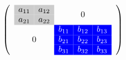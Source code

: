 \documentclass{book}
\begin{document}
\begin{equation*}
\left(
\begin{array}{c@{}c}
\begin{array}{>{\columncolor[gray]{.8}}c>{\columncolor[gray]{.8}}c}
a_{11} & a_{12} \\
a_{21} & a_{22} \\
\end{array} & 0  \\
0 & \begin{array}{>{\color{white}}c>{\color{white}}c>{\color{white}}c}
\rowcolor{blue}b_{11} & b_{12} & b_{13}\\
\rowcolor{blue}b_{21} & b_{22} & b_{23}\\
\rowcolor{blue}b_{31} & b_{32} & b_{33}\\
\end{array}\\
\end{array}\right)
\end{equation*}
\end{document}
